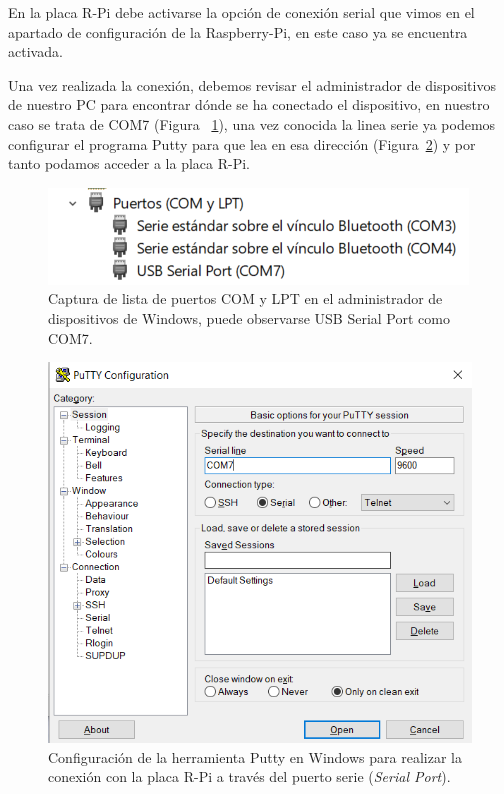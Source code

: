 En la placa R-Pi debe activarse la opción de conexión serial que vimos en el apartado de configuración de la Raspberry-Pi, en este caso ya se encuentra activada.

Una vez realizada la conexión, debemos revisar el administrador de dispositivos de nuestro PC para encontrar dónde se ha conectado el dispositivo, en nuestro caso se trata de COM7 (Figura ~\ref{fig:com7}), una vez conocida la linea serie ya podemos configurar el programa Putty para que lea en esa dirección (Figura~\ref{fig:puttyConf}) y por tanto podamos acceder a la placa R-Pi.

\begin{figure}[tbh]
\centering
\includegraphics[scale=1]{images/serialCOM.png}
\caption[Puertos COM y LPT en Windows]{Captura de lista de puertos COM y LPT en el administrador de dispositivos de Windows, puede observarse USB Serial Port como COM7.}%
\label{fig:com7}
\end{figure}

\begin{figure}[tbh]
\centering
\includegraphics[scale=0.8]{images/putty.png}
\caption[Configuración de Putty para conexión con Raspberry-Pi]{Configuración de la herramienta Putty en Windows para realizar la conexión con la placa R-Pi a través del puerto serie ({\protect\em Serial Port}).}%
\label{fig:puttyConf}
\end{figure}

